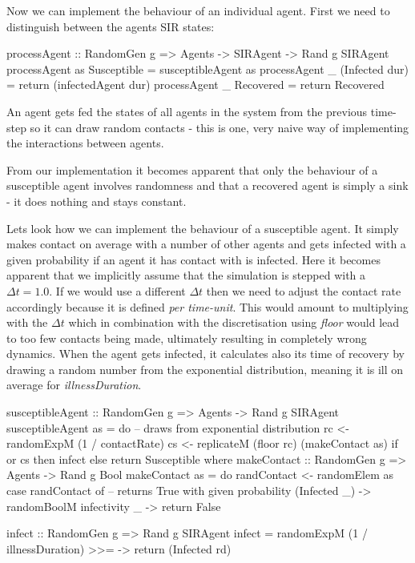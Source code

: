 Now we can implement the behaviour of an individual agent. First we need to distinguish between the agents SIR states:

\begin{HaskellCode}
processAgent :: RandomGen g 
  => Agents -> SIRAgent -> Rand g SIRAgent
processAgent as Susceptible    = susceptibleAgent as
processAgent _  (Infected dur) = return (infectedAgent dur)
processAgent _  Recovered      = return Recovered
\end{HaskellCode}

An agent gets fed the states of all agents in the system from the previous time-step so it can draw random contacts - this is one, very naive way of implementing the interactions between agents.

From our implementation it becomes apparent that only the behaviour of a susceptible agent involves randomness and that a recovered agent is simply a sink - it does nothing and stays constant.

Lets look how we can implement the behaviour of a susceptible agent. It simply makes contact on average with a number of other agents and gets infected with a given probability if an agent it has contact with is infected. Here it becomes apparent that we implicitly assume that the simulation is stepped with a $\Delta t = 1.0$. If we would use a different $\Delta t$ then we need to adjust the contact rate accordingly because it is defined \textit{per time-unit}. This would amount to multiplying with the $\Delta t$ which in combination with the discretisation using \textit{floor} would lead to too few contacts being made, ultimately resulting in completely wrong dynamics.
When the agent gets infected, it calculates also its time of recovery by drawing a random number from the exponential distribution, meaning it is ill on average for \textit{illnessDuration}.

\begin{HaskellCode}
susceptibleAgent :: RandomGen g => Agents -> Rand g SIRAgent
susceptibleAgent as = do
    -- draws from exponential distribution
    rc <- randomExpM (1 / contactRate) 
    cs <- replicateM (floor rc) (makeContact as)
    if or cs
      then infect
      else return Susceptible
  where
    makeContact :: RandomGen g => Agents -> Rand g Bool
    makeContact as = do
      randContact <- randomElem as
      case randContact of
        -- returns True with given probability 
        (Infected _) -> randomBoolM infectivity 
        _            -> return False

    infect :: RandomGen g => Rand g SIRAgent
    infect = randomExpM (1 / illnessDuration) 
               >>= \rd -> return (Infected rd)
\end{HaskellCode}

